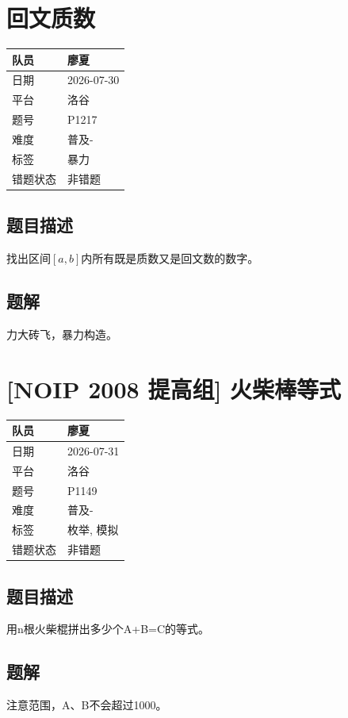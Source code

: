 \documentclass[12pt,a4paper]{ctexart}
\begin{document}
\section{回文质数}
\begin{tabular}{|l|l|}
\hline
队员 & 廖夏 \\ \hline
日期 & 2026-07-30 \\ \hline
平台 & 洛谷 \\ \hline
题号 & P1217 \\ \hline
难度 & 普及- \\ \hline
标签 & 暴力 \\ \hline
错题状态 & 非错题 \\ \hline
\end{tabular}

\subsection{题目描述}
找出区间$[a,b]$内所有既是质数又是回文数的数字。

\subsection{题解}
力大砖飞，暴力构造。


\section{{}[NOIP 2008 提高组] 火柴棒等式}
\begin{tabular}{|l|l|}
\hline
队员 & 廖夏 \\ \hline
日期 & 2026-07-31 \\ \hline
平台 & 洛谷 \\ \hline
题号 & P1149 \\ \hline
难度 & 普及- \\ \hline
标签 & 枚举, 模拟 \\ \hline
错题状态 & 非错题 \\ \hline
\end{tabular}

\subsection{题目描述}
用n根火柴棍拼出多少个A+B=C的等式。

\subsection{题解}
注意范围，A、B不会超过1000。
\end{document}
